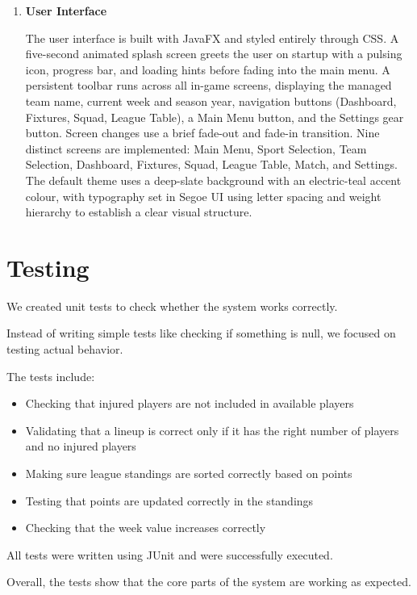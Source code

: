 \documentclass[11pt,a4paper]{article}
\begin{document}
\begin{enumerate}
Show Detailed Events---toggles between a full event log (goals, yellow cards, injuries) and a compact goals-only view.

\item \textbf{User Interface}

The user interface is built with JavaFX and styled entirely through CSS. A five-second animated splash screen greets the user on startup with a pulsing icon, progress bar, and loading hints before fading into the main menu. A persistent toolbar runs across all in-game screens, displaying the managed team name, current week and season year, navigation buttons (Dashboard, Fixtures, Squad, League Table), a Main Menu button, and the Settings gear button. Screen changes use a brief fade-out and fade-in transition. Nine distinct screens are implemented: Main Menu, Sport Selection, Team Selection, Dashboard, Fixtures, Squad, League Table, Match, and Settings. The default theme uses a deep-slate background with an electric-teal accent colour, with typography set in Segoe UI using letter spacing and weight hierarchy to establish a clear visual structure.
\end{enumerate}

\section{Testing}

We created unit tests to check whether the system works correctly.

Instead of writing simple tests like checking if something is null, we focused on testing actual behavior.

The tests include:
\begin{itemize}
\item Checking that injured players are not included in available players
\item Validating that a lineup is correct only if it has the right number of players and no injured players
\item Making sure league standings are sorted correctly based on points
\item Testing that points are updated correctly in the standings

\item Checking that the week value increases correctly
\end{itemize}

All tests were written using JUnit and were successfully executed.

Overall, the tests show that the core parts of the system are working as expected.
\end{document}
